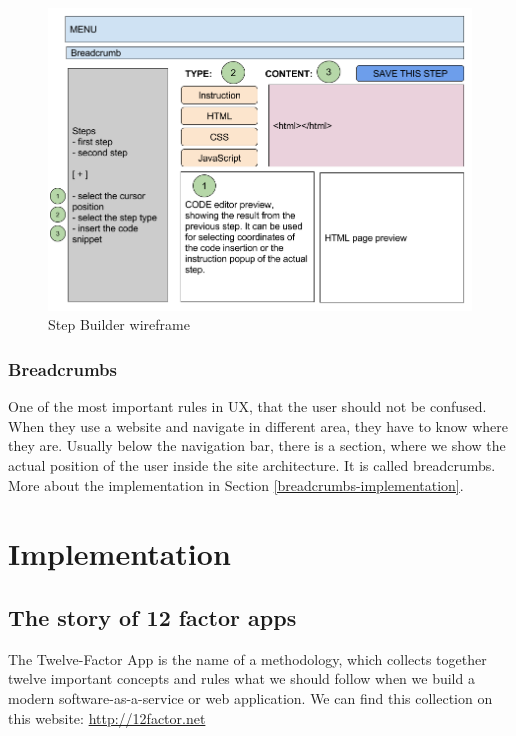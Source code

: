 \documentclass[11pt, a4paper, oneside, openright, medskipamount]{report}
\begin{document}
\begin{figure}[ht]
\centering
\includegraphics[width=1\textwidth]{assets/step-builder-wireframe.png}
\caption{Step Builder wireframe}
\label{fig:step-builder-wireframe}
\end{figure}

\subsection{Breadcrumbs}

One of the most important rules in UX, that the user should not be confused. When they use a website and navigate in different area, they have to know where they are. Usually below the navigation bar, there is a section, where we show the actual position of the user inside the site architecture. It is called breadcrumbs. More about the implementation in Section \ref{breadcrumbs-implementation}.

\chapter{Implementation}

\section{The story of 12 factor apps}

The Twelve-Factor App is the name of a methodology, which collects together twelve important concepts and rules what we should follow when we build a modern software-as-a-service or web application. We can find this collection on this website: \url{http://12factor.net}
\end{document}
